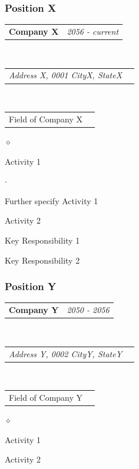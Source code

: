 \documentclass[a4paper]{article}
\makeatletter
\newcommand{\headerrow}[2]
{\begin{tabular*}{\textwidth}{l@{\extracolsep{\fill}}r}
	#1 &
	#2 \\
\end{tabular*}}
\renewenvironment{itemize}{
  \begin{list}{$\diamond$}{
    \setlength{\topsep}{0.25em}
    \setlength{\itemsep}{0em}
    \setlength{\parskip}{0pt}
    \setlength{\parsep}{0em}
  }
}{
  \end{list}
}
\newenvironment{itemize2}{
  \begin{list}{$\cdot$}{
    \setlength{\topsep}{0.25em}
    \setlength{\itemsep}{0em}
    \setlength{\parskip}{0pt}
    \setlength{\parsep}{0em}
  }
}{
  \end{list}
}
\makeatother
\begin{document}
      \subsubsection*{Position X}
      \headerrow
  		{\textbf{Company X}}{\emph{2056 - current}}
      \\
      \headerrow
        {\emph{Address X, 0001 CityX, StateX}}{}
      \\
      \headerrow
        {Field of Company X}{}

      \begin{itemize}
          \item Activity 1
          \begin{itemize2}
              \item Further specify Activity 1
          \end{itemize2}
          \item Activity 2
          \item Key Responsibility 1
          \item Key Responsibility 2
      \end{itemize}

      \subsubsection*{Position Y}
      \headerrow
  		{\textbf{Company Y}}{\emph{2050 - 2056}}
      \\
      \headerrow
        {\emph{Address Y, 0002 CityY, StateY}}{}
      \\
      \headerrow
          {Field of Company Y}{}

      \begin{itemize}
          \item Activity 1
          \item Activity 2
      \end{itemize}

\end{document}

